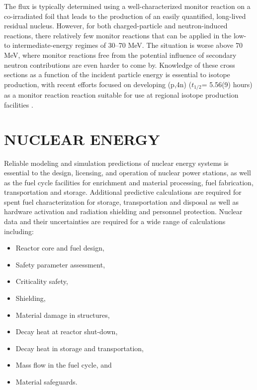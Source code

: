 \documentclass[letterpaper]{ar-1col}
\begin{document}
The flux is typically determined using a well-characterized monitor reaction on a co-irradiated foil that leads to the production of an easily quantified, long-lived residual nucleus.
However, for both charged-particle and neutron-induced reactions, there relatively few monitor reactions that can be applied in the low- to intermediate-energy regimes of 30--70 MeV.
 The situation is worse above 70 MeV, where monitor reactions  free from the potential influence of secondary neutron contributions are even harder to come by.
 Knowledge of these cross sections as a function of the incident particle energy is essential to  isotope production, with recent efforts focused on developing  (p,4n) ($t_{1/2}$= 5.56(9) hours) as a monitor reaction reaction suitable for use at regional isotope production facilities \cite{Voyles2018a, Kim2018}.
 


\section{NUCLEAR ENERGY}

Reliable modeling and simulation predictions of nuclear energy systems is essential to the design, licensing, and operation of nuclear power stations, as well as the fuel cycle facilities for enrichment and material processing, fuel fabrication, transportation and storage.
Additional predictive calculations are required for spent fuel characterization for storage, transportation and disposal as well as hardware activation and radiation shielding and personnel protection.
Nuclear data and their uncertainties are required for a wide range of calculations including:
\begin{itemize}
  \item Reactor core and fuel design,
  \item Safety parameter assessment,
  \item Criticality safety,
  \item Shielding,
  \item Material damage in structures,
  \item Decay heat at reactor shut-down,
  \item Decay heat in storage and transportation,
  \item Mass flow in the fuel cycle, and
  \item Material safeguards.
\end{itemize}
\end{document}
